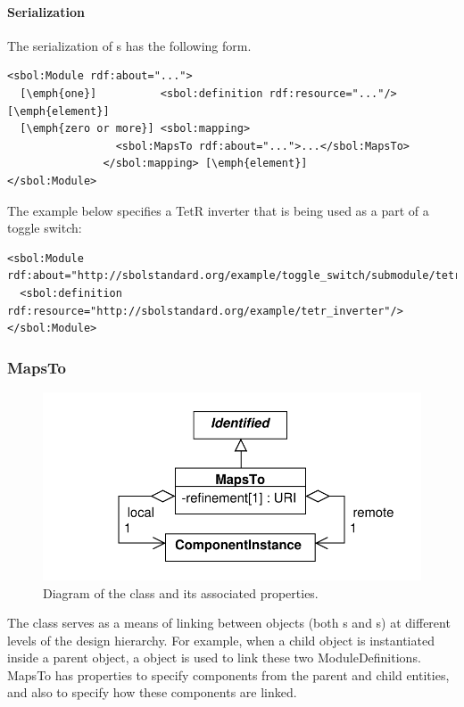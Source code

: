 \paragraph{Serialization}
The serialization of s has the following form.
\begin{lstlisting}
<sbol:Module rdf:about="...">
  [\emph{one}]          <sbol:definition rdf:resource="..."/>[\emph{element}]
  [\emph{zero or more}] <sbol:mapping>
                 <sbol:MapsTo rdf:about="...">...</sbol:MapsTo>
               </sbol:mapping> [\emph{element}]
</sbol:Module>
\end{lstlisting}

The example below specifies a TetR inverter that is being used as
a part of a toggle switch:

\begin{lstlisting}
<sbol:Module rdf:about="http://sbolstandard.org/example/toggle_switch/submodule/tetr_inverter">
  <sbol:definition rdf:resource="http://sbolstandard.org/example/tetr_inverter"/>
</sbol:Module>
\end{lstlisting}


\subsubsection{MapsTo}
\label{sec:MapsTo}

\begin{figure}[ht]
\begin{center}
\includegraphics[scale=0.6]{uml/maps_to}
\caption[]{Diagram of the  class and its associated properties.}
\label{uml:maps_to}
\end{center}
\end{figure}
The  class serves as a means of linking between  objects (both s and s) at different levels of the design hierarchy. For example, when a child  object is instantiated inside a parent  object, a  object is used to link these two ModuleDefinitions. MapsTo has properties to specify components from the parent and child entities, and also to specify how these components are linked.

